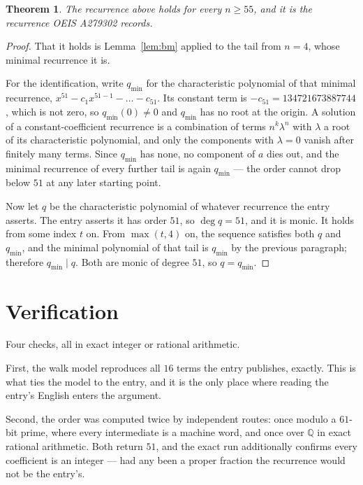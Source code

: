 \documentclass[11pt,a4paper]{article}
\theoremstyle{plain}
\newtheorem{theorem}{Theorem}
\theoremstyle{definition}
\begin{document}
\begin{theorem}
The recurrence above holds for every $n\ge55$, and it is the recurrence OEIS A279302 records.
\end{theorem}

\begin{proof}
That it holds is Lemma~\ref{lem:bm} applied to the tail from $n=4$, whose minimal
recurrence it is.

For the identification, write $q_{\min}$ for the characteristic polynomial of that minimal
recurrence, $x^{51}-c_1x^{51-1}-\dots-c_{51}$. Its constant term is
$-c_{51}=134721673887744$, which is not zero, so $q_{\min}(0)\neq0$ and $q_{\min}$ has no
root at the origin. A solution of a constant-coefficient recurrence is a combination of terms
$n^{k}\lambda^{n}$ with $\lambda$ a root of its characteristic polynomial, and only the
components with $\lambda=0$ vanish after finitely many terms. Since $q_{\min}$ has none, no
component of $a$ dies out, and the minimal recurrence of every further tail is again
$q_{\min}$ --- the order cannot drop below $51$ at any later starting point.

Now let $q$ be the characteristic polynomial of whatever recurrence the entry asserts. The
entry asserts it has order $51$, so $\deg q=51$, and it is monic. It holds from some
index $t$ on. From $\max(t,4)$ on, the sequence satisfies both $q$ and $q_{\min}$, and
the minimal polynomial of that tail is $q_{\min}$ by the previous paragraph; therefore
$q_{\min}\mid q$. Both are monic of degree $51$, so $q=q_{\min}$.
\end{proof}

\section{Verification}

Four checks, all in exact integer or rational arithmetic.

First, the walk model reproduces all $16$ terms the entry publishes, exactly. This is
what ties the model to the entry, and it is the only place where reading the entry's English
enters the argument.

Second, the order was computed twice by independent routes: once modulo a $61$-bit prime, where
every intermediate is a machine word, and once over $\mathbb{Q}$ in exact rational arithmetic.
Both return $51$, and the exact run additionally confirms every coefficient is an integer
--- had any been a proper fraction the recurrence would not be the entry's.
\end{document}

